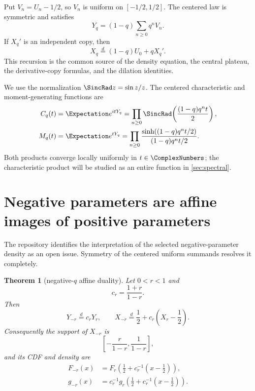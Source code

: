 \documentclass[11pt]{article}
\newtheorem{theorem}{Theorem}[section]
\theoremstyle{definition}
\theoremstyle{remark}
\begin{document}
Put $V_n=U_n-1/2$, so $V_n$ is uniform on $[-1/2,1/2]$.  The centered law is symmetric and satisfies
\begin{equation}\label{eq:centered-series}
 Y_q=(1-q)\sum_{n\ge0}q^nV_n.
\end{equation}
If $X_q'$ is an independent copy, then
\begin{equation}\label{eq:distributional-recursion}
 X_q\overset d=(1-q)U_0+qX_q'.
\end{equation}
This recursion is the common source of the density equation, the central plateau, the derivative-copy formulas, and the dilation identities.

We use the normalization $\SincRad z=\sin z/z$.  The centered characteristic and moment-generating functions are
\begin{align}
 C_q(t)&=\Expectation e^{itY_q}
 =\prod_{n\ge0}\SincRad\!\left(\frac{(1-q)q^nt}{2}\right),\label{eq:Cq}\\
 M_q(t)&=\Expectation e^{tY_q}
 =\prod_{n\ge0}\frac{\sinh((1-q)q^nt/2)}{(1-q)q^nt/2}.
 \label{eq:Mq}
\end{align}
Both products converge locally uniformly in $t\in\ComplexNumbers$; the characteristic product will be studied as an entire function in \cref{sec:spectral}.

\section{Negative parameters are affine images of positive parameters}

The repository identifies the interpretation of the selected negative-parameter density as an open issue.  Symmetry of the centered uniform summands resolves it completely.

\begin{theorem}[negative-$q$ affine duality]\label{thm:negative-duality}
Let $0<r<1$ and
\[
 c_r=\frac{1+r}{1-r}.
\]
Then
\begin{equation}\label{eq:negative-duality}
 Y_{-r}\overset d=c_rY_r,
 \qquad
 X_{-r}\overset d=\frac12+c_r\left(X_r-\frac12\right).
\end{equation}
Consequently the support of $X_{-r}$ is
\begin{equation}\label{eq:negative-support}
 \left[-\frac{r}{1-r},\frac{1}{1-r}\right],
\end{equation}
and its CDF and density are
\begin{align}
 F_{-r}(x)&=F_r\!\left(\frac12+c_r^{-1}\left(x-\frac12\right)\right),\label{eq:negative-cdf}\\
 g_{-r}(x)&=c_r^{-1}g_r\!\left(\frac12+c_r^{-1}\left(x-\frac12\right)\right).
 \label{eq:negative-density}
\end{align}
\end{theorem}
\end{document}
